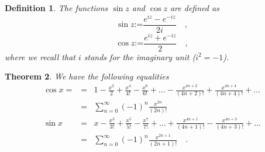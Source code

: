 \documentclass[12pt]{book}
\newcommand{\eqdef}{\textbf{:=}}
\newtheorem{theorem}{Theorem}[section]
\newtheorem{definition}[theorem]{Definition}
\begin{document}
\begin{definition}
The functions $\sin z$ and $\cos z$ are defined as
\begin{equation}\boxed{
\sin z\eqdef \frac{e^{iz}-e^{-iz}}{2i} \quad ,
}
\end{equation}
\begin{equation}\boxed{
\cos z\eqdef \frac{e^{iz}+e^{-iz}}{2}\quad ,
}
\end{equation}
where we recall that $i$ stands for the imaginary unit ($i^2=-1$).
\end{definition}
\begin{theorem}\label{thSinCosMaclaurinSeries} We have the following equalities
\begin{equation}\label{eqSinCosMaclaurinSeries}
\begin{array}{rcl}
\cos x= &=&\displaystyle 1-\frac{x^2}{2}+ \frac{x^4}{4!}- \frac{x^6}{6!} +\dots - \frac{x^{4n+2}}{(4n+2)!}+ \frac{x^{4n+4}}{ (4n+4)!} +\dots\\
&=& \displaystyle \sum_{n=0}^\infty (-1)^n \frac{x^{2n} }{ (2n)!} \\
\sin x& =&\displaystyle  x-\frac{x^3}{3!}+ \frac{x^5}{5!}- \frac{x^7}{7!} +\dots + \frac{x^{4n+1}}{(4n+1 )!}- \frac{x^{4n+3}}{ (4n+3)!} +\dots\\
&=&\displaystyle \sum_{n=0}^{\infty}(-1)^n \frac{x^{2n+1}}{ (2n+1)!} \quad .
\end{array}
\end{equation}
\end{theorem}
\end{document}
